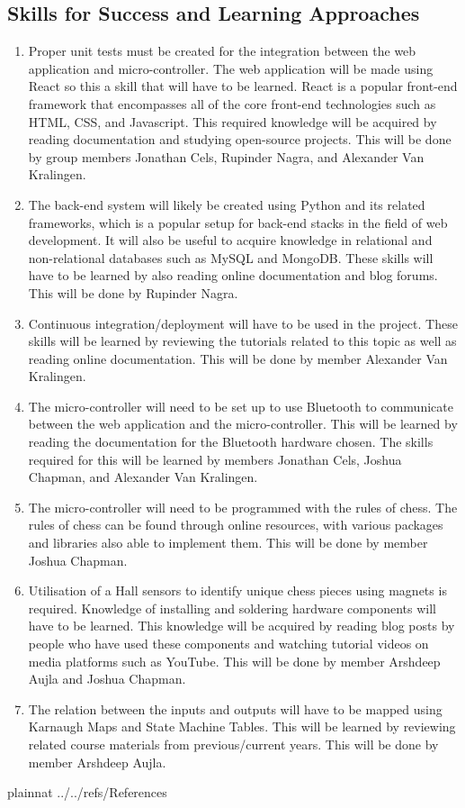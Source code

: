 \documentclass[12pt]{article}
\begin{document}
\subsection{Skills for Success and Learning Approaches}
\noindent
\begin{enumerate}[{SS}1., leftmargin=2\parindent]
    \item Proper unit tests must be created for the integration between the web application
     and micro-controller. The web application will be made using React so this a skill 
     that will have to be learned. React is a popular front-end framework that encompasses all of the core front-end technologies such as
     HTML, CSS, and Javascript. This required knowledge will be acquired by reading 
     documentation and studying open-source projects. This will be done by group members Jonathan Cels, Rupinder Nagra, and Alexander Van Kralingen.
    \item The back-end system will likely be created using Python and its related frameworks, which is a popular setup for back-end stacks
    in the field of web development. It will also be useful to acquire knowledge in relational and non-relational databases such as MySQL
    and MongoDB. These skills will have to be learned by also reading online documentation and blog forums. This will be done by Rupinder Nagra.
    \item Continuous integration/deployment will have to be used in the project. These skills will be learned by reviewing the tutorials related to this topic as well as reading online documentation. This will be done by member Alexander Van Kralingen.
    \item The micro-controller will need to be set up to use Bluetooth to communicate between the web application and the micro-controller. This will be learned by reading the documentation for the Bluetooth hardware chosen. The skills required for this will be learned by members Jonathan Cels, Joshua Chapman, and Alexander Van Kralingen.
    \item The micro-controller will need to be programmed with the rules of chess. The rules of chess can be found through online resources, with various packages and libraries also able to implement them. This will be done by member Joshua Chapman.
    \item Utilisation of a Hall sensors to identify unique chess pieces using magnets is required. Knowledge of installing and soldering hardware components will have to be learned. This knowledge will be acquired by reading blog posts by people who have used these components and watching tutorial videos on media platforms such as YouTube. This will be done by member Arshdeep Aujla and Joshua Chapman.
    \item The relation between the inputs and outputs will have to be mapped using Karnaugh Maps and State Machine Tables. This will be learned by reviewing related course materials from previous/current years. This will be done by member Arshdeep Aujla.
\end{enumerate}
\newpage

 {plainnat}
 {../../refs/References}
\end{document}
